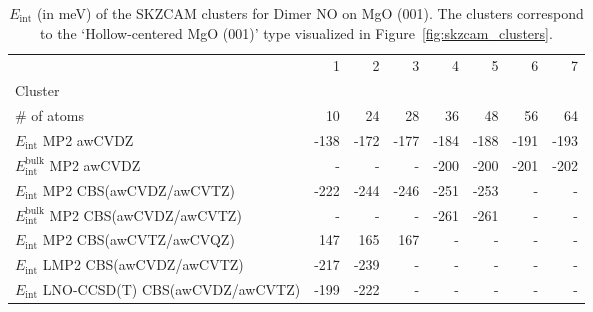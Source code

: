 \begin{table}
\caption{\label{tab:system_eint_mgo_no_dimer}$E_\textrm{int}$ (in meV) of the SKZCAM clusters for Dimer NO on MgO (001). The clusters correspond to the `Hollow-centered MgO (001)' type visualized in Figure~\ref{fig:skzcam_clusters}.}
\begin{adjustbox}{center,max width=1.4\textwidth}
\begin{tabular}{lrrrrrrr}
\toprule
 & 1 & 2 & 3 & 4 & 5 & 6 & 7 \\ 
Cluster &  &  &  &  &  &  &  \\
\midrule
\# of atoms & 10 & 24 & 28 & 36 & 48 & 56 & 64 \\
$E_\textrm{int}$ MP2 awCVDZ & -138 & -172 & -177 & -184 & -188 & -191 & -193 \\
$E_\textrm{int}^\textrm{bulk}$ MP2 awCVDZ & - & - & - & -200 & -200 & -201 & -202 \\
$E_\textrm{int}$ MP2 CBS(awCVDZ/awCVTZ) & -222 & -244 & -246 & -251 & -253 & - & - \\
$E_\textrm{int}^\textrm{bulk}$ MP2 CBS(awCVDZ/awCVTZ) & - & - & - & -261 & -261 & - & - \\
$E_\textrm{int}$ MP2 CBS(awCVTZ/awCVQZ) & 147 & 165 & 167 & - & - & - & - \\
$E_\textrm{int}$ LMP2 CBS(awCVDZ/awCVTZ) & -217 & -239 & - & - & - & - & - \\
$E_\textrm{int}$ LNO-CCSD(T) CBS(awCVDZ/awCVTZ) & -199 & -222 & - & - & - & - & - \\
\bottomrule
\end{tabular}
\end{adjustbox}
\end{table}

